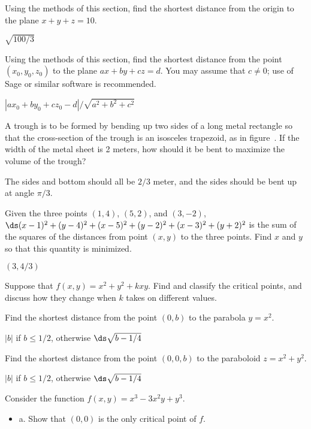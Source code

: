 \begin{exercises}
\exercise Using the methods of this section, find the shortest
distance from the origin to the plane $x+y+z=10$.
\begin{answer} $\sqrt{100/3}$
\end{answer}

\exercise Using the methods of this section, find the shortest
distance from the point $(x_0,y_0,z_0)$ to the plane $ax+by+cz=d$.
You may assume that $c\not=0$; use of Sage or similar software
is recommended.
\begin{answer} $|ax_0+by_0+cz_0-d|/\sqrt{a^2+b^2+c^2}$
\end{answer}

\exercise A trough is to be formed by bending up two sides of a long
metal rectangle
so that the cross-section of the trough is an isosceles trapezoid, as
in figure~. If the width of the metal sheet is 2
meters, how should it be bent to maximize the volume of the trough?
\begin{answer} The sides and bottom should all be $2/3$ meter, and the sides
should be bent up at angle $\pi/3$.
\end{answer}

\exercise Given the three points $(1,4)$, $(5,2)$, and $(3,-2)$, 
$\ds(x-1)^2+(y-4)^2+(x-5)^2+(y-2)^2+(x-3)^2+(y+2)^2$
is the sum of the squares of the distances from point $(x,y)$ to the
three points. Find $x$ and $y$ so that this quantity is minimized.
\begin{answer} $(3,4/3)$
\end{answer}

\exercise Suppose that $f(x,y)=x^2+y^2+kxy$. Find and classify the
  critical points, and discuss how they change when $k$ takes on
  different values.

\exercise Find the shortest distance from the point $(0,b)$ to the
  parabola $y=x^2$.
\begin{answer} $|b|$ if $b\le1/2$, otherwise $\ds\sqrt{b-1/4}$
\end{answer}

\exercise Find the shortest distance from the point $(0,0,b)$ to the
  paraboloid $z=x^2+y^2$.
\begin{answer} $|b|$ if $b\le1/2$, otherwise $\ds\sqrt{b-1/4}$
\end{answer}

\exercise Consider the function $f(x,y)=x^3-3x^2y+y^3$.

\begin{itemize} %
\item{a.} Show that $(0,0)$ is the only critical point of $f$.


\end{itemize}
\end{exercises}
